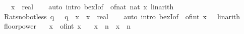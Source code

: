 \begin{isabellebody}
\ \ \ x\ {\isacharcolon}{\kern0pt}{\isacharcolon}{\kern0pt}\ real\isanewline
%
\isadelimproof
\ \ %
\endisadelimproof
%
\isatagproof
{}\isamarkupfalse%
\ {\isacharparenleft}{\kern0pt}auto\ intro{\isacharbang}{\kern0pt}{\isacharcolon}{\kern0pt}\ bexI{\isacharbrackleft}{\kern0pt}of\ {\isacharunderscore}{\kern0pt}\ {\isachardoublequoteopen}of{\isacharunderscore}{\kern0pt}nat\ {\isacharparenleft}{\kern0pt}nat\ {\isasymlceil}x{\isasymrceil}{\isacharparenright}{\kern0pt}{\isachardoublequoteclose}{\isacharbrackright}{\kern0pt}{\isacharparenright}{\kern0pt}\ linarith%
\endisatagproof
{\isafoldproof}%
%
\isadelimproof
\isanewline
%
\endisadelimproof
\isanewline
{}\isamarkupfalse%
\ Rats{\isacharunderscore}{\kern0pt}no{\isacharunderscore}{\kern0pt}bot{\isacharunderscore}{\kern0pt}less{\isacharcolon}{\kern0pt}\ {\isachardoublequoteopen}{\isasymexists}q\ {\isasymin}\ {\isasymrat}{\isachardot}{\kern0pt}\ q\ {\isacharless}{\kern0pt}\ x{\isachardoublequoteclose}\ \ x\ {\isacharcolon}{\kern0pt}{\isacharcolon}{\kern0pt}\ real\isanewline
%
\isadelimproof
\ \ %
\endisadelimproof
%
\isatagproof
{}\isamarkupfalse%
\ {\isacharparenleft}{\kern0pt}auto\ intro{\isacharbang}{\kern0pt}{\isacharcolon}{\kern0pt}\ bexI{\isacharbrackleft}{\kern0pt}of\ {\isacharunderscore}{\kern0pt}\ {\isachardoublequoteopen}of{\isacharunderscore}{\kern0pt}int\ {\isacharparenleft}{\kern0pt}{\isasymlfloor}x{\isasymrfloor}\ {\isacharminus}{\kern0pt}\ {}{\isacharparenright}{\kern0pt}{\isachardoublequoteclose}{\isacharbrackright}{\kern0pt}{\isacharparenright}{\kern0pt}\ linarith%
\endisatagproof
{\isafoldproof}%
%
\isadelimproof
%
\endisadelimproof
%
\isadelimdocument
%
\endisadelimdocument
%
\isatagdocument
%
\isamarkuptrue%
%
\endisatagdocument
{\isafolddocument}%
%
\isadelimdocument
%
\endisadelimdocument
{}\isamarkupfalse%
\ floor{\isacharunderscore}{\kern0pt}power{\isacharcolon}{\kern0pt}\isanewline
\ \ \ {\isachardoublequoteopen}x\ {\isacharequal}{\kern0pt}\ of{\isacharunderscore}{\kern0pt}int\ {\isasymlfloor}x{\isasymrfloor}{\isachardoublequoteclose}\isanewline
\ \ \ {\isachardoublequoteopen}{\isasymlfloor}x\ {\isacharcircum}{\kern0pt}\ n{\isasymrfloor}\ {\isacharequal}{\kern0pt}\ {\isasymlfloor}x{\isasymrfloor}\ {\isacharcircum}{\kern0pt}\ n{\isachardoublequoteclose}\isanewline
%
\isadelimproof
%
\endisadelimproof
%
\isatagproof
{}\isamarkupfalse%
\ {\isacharminus}{\kern0pt}\isanewline
\ \ \isamarkupfalse%

\end{isabellebody}
